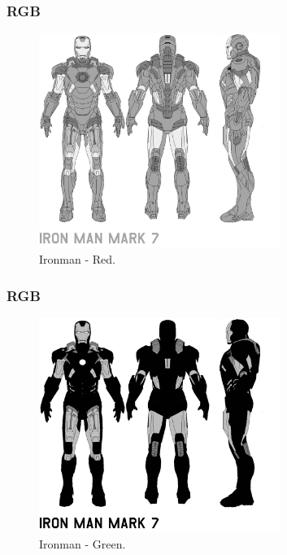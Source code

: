 \documentclass{beamer}
\begin{document}
\begin{frame}
\frametitle{RGB}
		
		\begin{figure}[!h]
			\begin{center}
				\includegraphics[width=0.7\textwidth]{Figures/Red}
				\caption{Ironman - Red.}
			\end{center}
		\end{figure}
	
\end{frame}

\begin{frame}
\frametitle{RGB}
		
		\begin{figure}[!h]
			\begin{center}
				\includegraphics[width=0.7\textwidth]{Figures/Green}
				\caption{Ironman - Green.}
			\end{center}
		\end{figure}
	
\end{frame}
\end{document}
